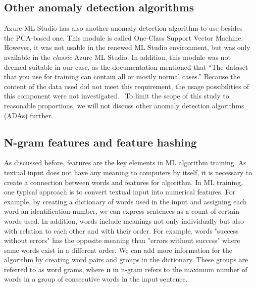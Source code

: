 
\subsection{Other anomaly detection algorithms}\label{bg-other-ada}

Azure ML Studio has
also another anomaly detection algorithm to use besides the PCA-based one.
This module is called One-Class Support Vector Machine.
However,
it was not usable in the renewed ML Studio environment,
but was only available in the \textit{classic} Azure ML Studio.
In addition,
this module was not deemed suitable in our case,
as the documentation mentioned that
\enquote{The dataset that you use for training
can contain all or mostly normal cases.}
Because the content of the data used did not meet this requirement,
the usage possibilities of this component were not investigated.~\cite{azure2021oneclasssvm}
To limit the scope of this study to reasonable proportions,
we will not discuss other anomaly detection algorithms (ADAs) further.


\subsection{N-gram features and feature hashing}\label{subsec:bg-ngram-features-and-hashing}

As discussed before,
features are the key elements in ML algorithm training.
As textual input does not have any meaning to computers by itself,
it is necessary to create a connection between words and features for algorithm.
In ML training,
one typical approach is to convert textual input into numerical features.
For example, by creating a dictionary of words used in the input
and assigning each word an identification number,
we can express sentences as a count of certain words used.
In addition,
words include meanings not only individually but also
with relation to each other and with their order.
For example,
words "success without errors"
has the opposite meaning than "errors without success"
where same words exist in a different order.
We can add more information for the algorithm
by creating word pairs and groups in the dictionary.
These groups are referred to as word grams,
where \textbf{n} in n-gram refers to the maximum number of words
in a group of consecutive words in the input sentence.~\cite{furnkranz1998study}

